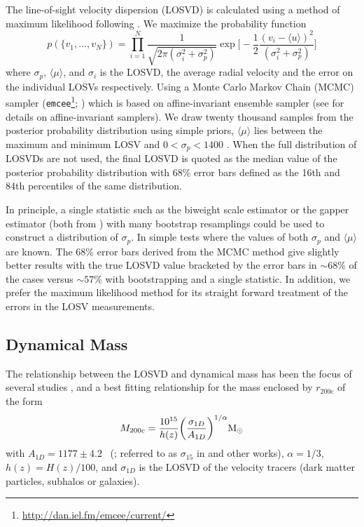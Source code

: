 \documentclass[fleqn,usenatbib]{mnras}
\begin{document}
The line-of-sight velocity dispersion (LOSVD) is calculated using a method of maximum likelihood following \cite{Walker2006}. We maximize the probability function 
\begin{equation}
  \label{eq: jointGaussian}
p(\{v_1, ..., v_N\})=\displaystyle\prod_{i=1}^{N}\frac{1}{\sqrt{2\pi(\sigma_i^2+\sigma_p^2)}}\exp\biggl[-\frac{1}{2}\frac{(v_i-\langle u \rangle)^2}{(\sigma_i^2+\sigma_p^2)}\biggr]
\end{equation}
where $\sigma_p$, $\langle\mu\rangle$, and $\sigma_i$ is the LOSVD, the average radial velocity and the error on the individual LOSVs respectively. Using a Monte Carlo Markov Chain (MCMC) sampler ({\tt emcee}\footnote{\url{http://dan.iel.fm/emcee/current/}}; \citealt{Foreman-Mackey2013}) which is based on affine-invariant ensemble sampler (see \citealt{Goodman2010} for details on affine-invariant samplers). We draw twenty thousand samples from the posterior probability distribution using simple priors, $\langle\mu\rangle$ lies between the maximum and minimum LOSV and $0< \sigma_p < 1400$ \kms. When the full distribution of LOSVDs are not used, the final LOSVD is quoted as the median value of the posterior probability distribution with 68\% error bars defined as the 16th and 84th percentiles of the same distribution.

In principle, a single statistic such as the biweight scale estimator or the gapper estimator (both from \citealt{Beers1990}) with many bootstrap resamplings could be used to construct a distribution of $\sigma_p$. In simple tests where the values of both $\sigma_p$ and $\langle\mu\rangle$ are known. The 68\% error bars derived from the MCMC method give slightly better results with the true LOSVD value bracketed by the error bars in $\sim68\%$ of the cases versus $\sim57\%$ with bootstrapping and a single statistic. In addition, we prefer the maximum likelihood method for its straight forward treatment of the errors in the LOSV measurements.

\subsection{Dynamical Mass}\label{sec: mass}
The relationship between the LOSVD and dynamical mass has been the focus of several studies , and a best fitting relationship for the mass enclosed by $r_{200c}$ of the form
\begin{equation}\label{eq:power law}
	M_{200c} = \frac{10^{15}}{h(z)} \bigg{(}\frac{\sigma_{1D}}{A_{1D}} \bigg{)}^{1/\alpha} \hbox{$\mathrm{M}_\odot$}
\end{equation}
with $A_{1D} = 1177 \pm 4.2$ \kms\ (\citealt{Munari2013}; referred to as $\sigma_{15}$ in \citealt{Evrard2008} and other works), $\alpha = 1/3$, $h(z) = H(z)/100$, and $\sigma_{1D}$ is the LOSVD of the velocity tracers (dark matter particles, subhalos or galaxies). 
\end{document}
